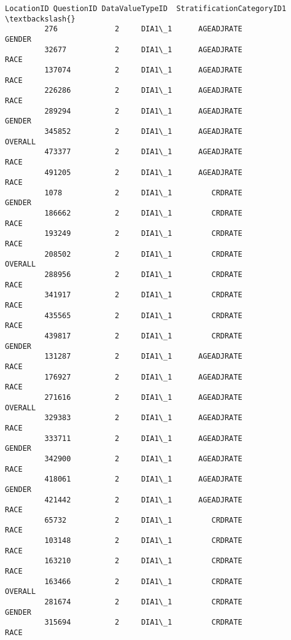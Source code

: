 \documentclass[11pt]{article}
\begin{document}
\begin{Verbatim}[commandchars=\\\{\}]
                LocationID QuestionID DataValueTypeID  StratificationCategoryID1  \textbackslash{}
         276             2     DIA1\_1      AGEADJRATE                     GENDER   
         32677           2     DIA1\_1      AGEADJRATE                       RACE   
         137074          2     DIA1\_1      AGEADJRATE                       RACE   
         226286          2     DIA1\_1      AGEADJRATE                       RACE   
         289294          2     DIA1\_1      AGEADJRATE                     GENDER   
         345852          2     DIA1\_1      AGEADJRATE                    OVERALL   
         473377          2     DIA1\_1      AGEADJRATE                       RACE   
         491205          2     DIA1\_1      AGEADJRATE                       RACE   
         1078            2     DIA1\_1         CRDRATE                     GENDER   
         186662          2     DIA1\_1         CRDRATE                       RACE   
         193249          2     DIA1\_1         CRDRATE                       RACE   
         208502          2     DIA1\_1         CRDRATE                    OVERALL   
         288956          2     DIA1\_1         CRDRATE                       RACE   
         341917          2     DIA1\_1         CRDRATE                       RACE   
         435565          2     DIA1\_1         CRDRATE                       RACE   
         439817          2     DIA1\_1         CRDRATE                     GENDER   
         131287          2     DIA1\_1      AGEADJRATE                       RACE   
         176927          2     DIA1\_1      AGEADJRATE                       RACE   
         271616          2     DIA1\_1      AGEADJRATE                    OVERALL   
         329383          2     DIA1\_1      AGEADJRATE                       RACE   
         333711          2     DIA1\_1      AGEADJRATE                     GENDER   
         342900          2     DIA1\_1      AGEADJRATE                       RACE   
         418061          2     DIA1\_1      AGEADJRATE                     GENDER   
         421442          2     DIA1\_1      AGEADJRATE                       RACE   
         65732           2     DIA1\_1         CRDRATE                       RACE   
         103148          2     DIA1\_1         CRDRATE                       RACE   
         163210          2     DIA1\_1         CRDRATE                       RACE   
         163466          2     DIA1\_1         CRDRATE                    OVERALL   
         281674          2     DIA1\_1         CRDRATE                     GENDER   
         315694          2     DIA1\_1         CRDRATE                       RACE   

\end{Verbatim}
\end{document}

